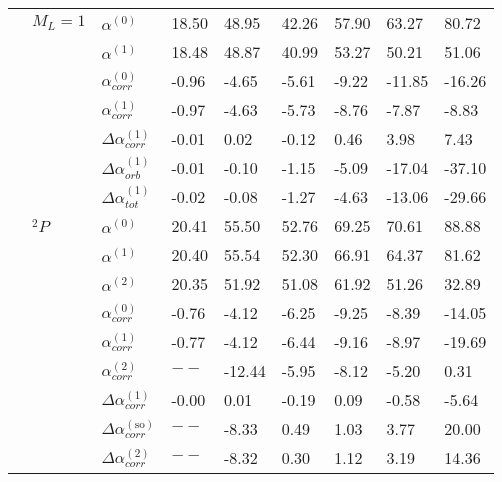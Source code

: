 \begin{longtable}{lllllllll}
      & $M_L=1$ & $\alpha^{(0)}$ &       18.50 &         48.95 &       42.26 &     57.90 &       63.27 &       80.72 \\
      &       & $\alpha^{(1)}$ &       18.48 &         48.87 &       40.99 &     53.27 &       50.21 &       51.06 \\
      &       & $\alpha_{corr}^{(0)}$ &       -0.96 &         -4.65 &       -5.61 &     -9.22 &      -11.85 &      -16.26 \\
      &       & $\alpha_{corr}^{(1)}$ &       -0.97 &         -4.63 &       -5.73 &     -8.76 &       -7.87 &       -8.83 \\
      &       & $\Delta \alpha_{corr}^{(\text{1})}$ &       -0.01 &          0.02 &       -0.12 &      0.46 &        3.98 &        7.43 \\
      &       & $\Delta \alpha_{orb}^{(\text{1})}$ &       -0.01 &         -0.10 &       -1.15 &     -5.09 &      -17.04 &      -37.10 \\
      &       & $\Delta \alpha_{tot}^{(\text{1})}$ &       -0.02 &         -0.08 &       -1.27 &     -4.63 &      -13.06 &      -29.66 \\
      & $^2P$ & $\alpha^{(0)}$ &       20.41 &         55.50 &       52.76 &     69.25 &       70.61 &       88.88 \\
      &       & $\alpha^{(1)}$ &       20.40 &         55.54 &       52.30 &     66.91 &       64.37 &       81.62 \\
      &       & $\alpha^{(2)}$ &       20.35 &         51.92 &       51.08 &     61.92 &       51.26 &       32.89 \\
      &       & $\alpha_{corr}^{(0)}$ &       -0.76 &         -4.12 &       -6.25 &     -9.25 &       -8.39 &      -14.05 \\
      &       & $\alpha_{corr}^{(1)}$ &       -0.77 &         -4.12 &       -6.44 &     -9.16 &       -8.97 &      -19.69 \\
      &       & $\alpha_{corr}^{(2)}$ &         $--$ &        -12.44 &       -5.95 &     -8.12 &       -5.20 &        0.31 \\
      &       & $\Delta \alpha_{corr}^{(\text{1})}$ &       -0.00 &          0.01 &       -0.19 &      0.09 &       -0.58 &       -5.64 \\
      &       & $\Delta \alpha_{corr}^{(\text{so})}$ &         $--$ &         -8.33 &        0.49 &      1.03 &        3.77 &       20.00 \\
      &       & $\Delta \alpha_{corr}^{(\text{2})}$ &         $--$ &         -8.32 &        0.30 &      1.12 &        3.19 &       14.36 \\

\end{longtable}

